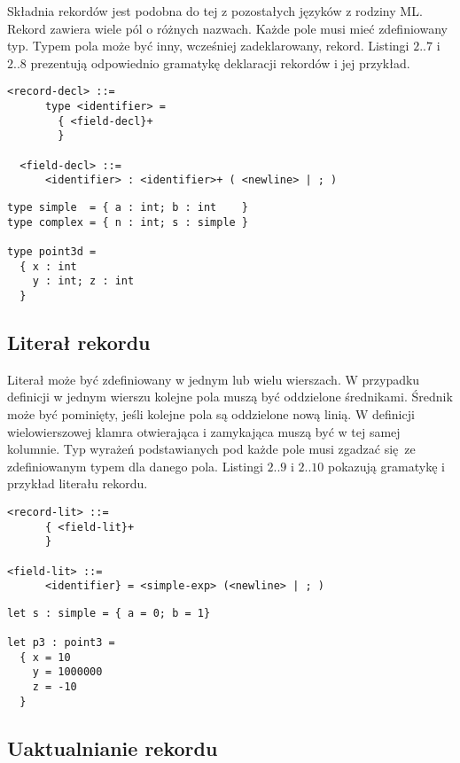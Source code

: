\documentclass[declaration,shortabstract]{iithesis}
\begin{document}
Składnia rekordów jest podobna do tej z pozostałych języków z rodziny ML. 
Rekord zawiera wiele pól o różnych nazwach. Każde pole musi mieć zdefiniowany 
typ. Typem pola może być inny, wcześniej zadeklarowany, rekord.
Listingi $2..7$ i $2..8$ prezentują odpowiednio gramatykę deklaracji rekordów
i jej przykład.

\begin{lstlisting}[frame=single, caption=Deklaracja rekordu.]
  <record-decl> ::=
      type <identifier> =
        { <field-decl}+ 
        }
  
  <field-decl> ::=
      <identifier> : <identifier>+ ( <newline> | ; )
\end{lstlisting}

\begin{lstlisting}[frame=single, caption=Definicja rekordu.]
type simple  = { a : int; b : int    }
type complex = { n : int; s : simple }

type point3d = 
  { x : int 
    y : int; z : int 
  }
\end{lstlisting}

\subsection{Literał rekordu}

Literał może być zdefiniowany w jednym lub wielu wierszach. W przypadku 
definicji w jednym wierszu kolejne pola muszą być oddzielone średnikami. 
Średnik może być pominięty, jeśli kolejne pola są oddzielone nową linią. 
W definicji wielowierszowej klamra otwierająca i zamykająca muszą być w tej 
samej kolumnie. Typ wyrażeń podstawianych pod każde pole musi zgadzać się ze 
zdefiniowanym typem dla danego pola. Listingi $2..9$ i $2..10$ pokazują 
gramatykę i przykład literału rekordu.

\begin{lstlisting}[frame=single, caption=Literał rekordu.]
<record-lit> ::=
      { <field-lit}+
      }

<field-lit> ::=
      <identifier} = <simple-exp> (<newline> | ; )
\end{lstlisting}

\begin{lstlisting}[frame=single, caption=Literał rekordu.]
let s : simple = { a = 0; b = 1}

let p3 : point3 = 
  { x = 10
    y = 1000000 
    z = -10 
  }
\end{lstlisting}

\subsection{Uaktualnianie rekordu}
\end{document}
